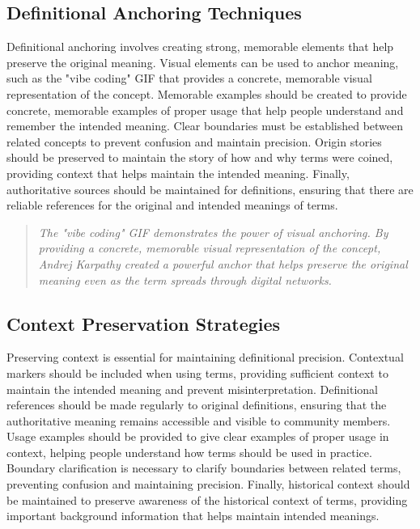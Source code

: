 \documentclass[11pt]{article}
\begin{document}
\subsection{Definitional Anchoring Techniques}

Definitional anchoring involves creating strong, memorable elements that help preserve the original meaning. Visual elements can be used to anchor meaning, such as the "vibe coding" GIF that provides a concrete, memorable visual representation of the concept. Memorable examples should be created to provide concrete, memorable examples of proper usage that help people understand and remember the intended meaning. Clear boundaries must be established between related concepts to prevent confusion and maintain precision. Origin stories should be preserved to maintain the story of how and why terms were coined, providing context that helps maintain the intended meaning. Finally, authoritative sources should be maintained for definitions, ensuring that there are reliable references for the original and intended meanings of terms.

\begin{quote}
\emph{The "vibe coding" GIF demonstrates the power of visual anchoring. By providing a concrete, memorable visual representation of the concept, Andrej Karpathy created a powerful anchor that helps preserve the original meaning even as the term spreads through digital networks.}
\end{quote}

\subsection{Context Preservation Strategies}

Preserving context is essential for maintaining definitional precision. Contextual markers should be included when using terms, providing sufficient context to maintain the intended meaning and prevent misinterpretation. Definitional references should be made regularly to original definitions, ensuring that the authoritative meaning remains accessible and visible to community members. Usage examples should be provided to give clear examples of proper usage in context, helping people understand how terms should be used in practice. Boundary clarification is necessary to clarify boundaries between related terms, preventing confusion and maintaining precision. Finally, historical context should be maintained to preserve awareness of the historical context of terms, providing important background information that helps maintain intended meanings.
\end{document}
